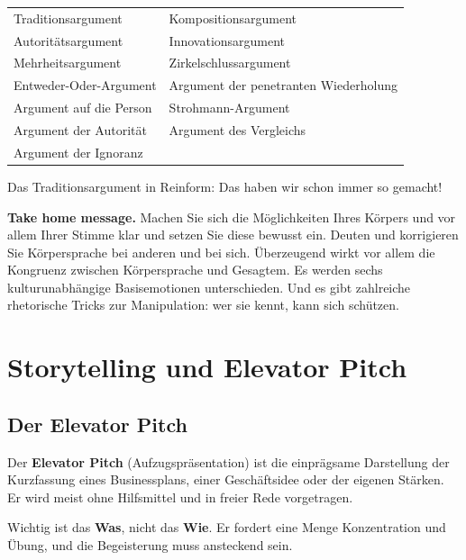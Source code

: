 \documentclass[12pt, a4paper]{article}
\begin{document}
\begin{center}
\begin{tabular}{ll}
Traditionsargument & Kompositionsargument\\
Autoritätsargument & Innovationsargument\\
Mehrheitsargument & Zirkelschlussargument\\
Entweder-Oder-Argument & Argument der penetranten Wiederholung\\
Argument auf die Person & Strohmann-Argument\\
Argument der Autorität & Argument des Vergleichs\\
Argument der Ignoranz & \\
\end{tabular}
\end{center}

Das Traditionsargument in Reinform: \glqq Das haben wir schon immer so
gemacht!\grqq{}

\begin{notebox}
\textbf{Take home message.} Machen Sie sich die Möglichkeiten Ihres Körpers
und vor allem Ihrer Stimme klar und setzen Sie diese bewusst ein. Deuten und
korrigieren Sie Körpersprache bei anderen und bei sich. Überzeugend wirkt vor
allem die Kongruenz zwischen Körpersprache und Gesagtem. Es werden sechs
kulturunabhängige Basisemotionen unterschieden. Und es gibt zahlreiche
rhetorische Tricks zur Manipulation: wer sie kennt, kann sich schützen.
\end{notebox}

\section{Storytelling und Elevator Pitch}

\subsection{Der Elevator Pitch}

\begin{definitionbox}
Der \textbf{Elevator Pitch} (\glqq Aufzugspräsentation\grqq{}) ist die
einprägsame Darstellung der Kurzfassung eines Businessplans, einer
Geschäftsidee oder der eigenen Stärken. Er wird meist ohne Hilfsmittel und in
freier Rede vorgetragen.
\end{definitionbox}

Wichtig ist das \textbf{Was}, nicht das \textbf{Wie}. Er fordert eine Menge
Konzentration und Übung, und die Begeisterung muss ansteckend sein.
\end{document}
